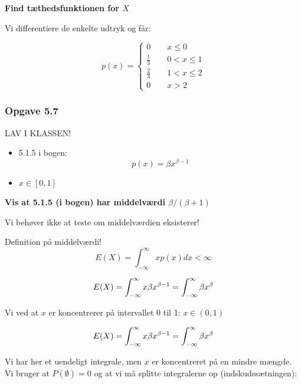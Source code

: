 \textbf{Find tæthedsfunktionen for $X$}

Vi differentiere de enkelte udtryk og får:

\begin{equation}
p(x) =
    \begin{cases}
        0 \qquad x \leq 0\\
        \frac{1}{3} \qquad 0 < x \leq 1 \\
        \frac{2}{3} \qquad 1 < x \leq 2 \\
        0 \qquad x > 2
    \end{cases}
\end{equation}

\subsubsection{Opgave 5.7}

LAV I KLASSEN!

\begin{itemize}
    \item 5.1.5 i bogen:
    \begin{equation}
    p(x) = \beta x^{\beta -1}
\end{equation}
    \item $x \in [0,1]$
\end{itemize}



\textbf{Vis at 5.1.5 (i bogen) har middelværdi $\beta / (\beta +1 )$}

Vi behøver ikke at teste om middelværdien eksisterer!

Definition på middelværdi!
\begin{equation}
    E(X) = \int_{-\infty}^{\infty} x p(x) dx < \infty
\end{equation}

\begin{align}
    E(X) = \int_{-\infty}^{\infty} x \beta x^{\beta -1}  = \int_{-\infty}^{\infty} \beta x^\beta
\end{align}

Vi ved at $ x$ er koncentrerer på intervallet 0 til 1: $x \in (0, 1)$

\begin{align}
    E(X) = \int_{-\infty}^{\infty} x \beta x^{\beta -1}  = \int_{-\infty}^{\infty} \beta x^\beta
\end{align}


Vi har her et uendeligt integrale, men $x$ er koncentreret på en mindre mængde. Vi bruger at $P(\emptyset)=0$ og at vi må splitte integralerne op (indskudssætningen):

